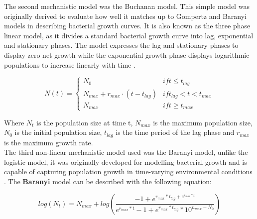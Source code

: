 \documentclass[11pt, a4paper]{article} %
\begin{document}
\noindent The second mechanistic model was the Buchanan model. This simple model was originally derived to evaluate how well it matches up to Gompertz and Baranyi models in describing bacterial growth curves. It is also known as the three phase linear model, as it divides a standard bacterial growth curve into lag, exponential and stationary phases. The model expresses the lag and stationary phases to display zero net growth while the exponential growth phase displays logarithmic populations to increase linearly with time \cite{buchanan1997simple}.

\begin{equation}
N(t)=\left\{\begin{matrix}
N_0 & if  t\leq t_{lag} \\ N_{max} + r_{max}\cdot (t-t_{lag})
 & if t_{lag} < t < t_{max} \\N_{max}
 & if t\geq t_{max} 
\end{matrix}\right.
\end{equation}

Where $N_t$ is the population size at time t, $N_{max}$ is the maximum population size, $N_0$ is the initial population size, $t_{lag}$ is the time period of the lag phase and $r_{max}$ is the maximum growth rate. \\




\noindent The third non-linear mechanistic model used was the Baranyi model, unlike the logistic model, it was originally developed for modelling bacterial growth and is capable of capturing population growth in time-varying environmental conditions \cite{grijspeerdt1999estimating}.  The \textbf{Baranyi} model can be described with the following equation:

\begin{equation}
log(N_t) = N_{max} + log(\frac{-1 + e^{r_{max} * t_{lag} + e^{r_{max} * t}}}{e^{r_{max} * t} - 1 + e^{r_{max} * t_{lag}} * 10^{n_{max} - N_0}})
\end{equation}
\end{document}
